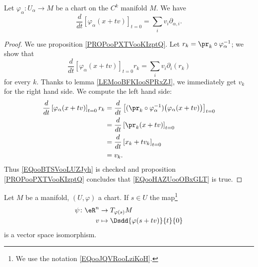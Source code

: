 \begin{proposition}	\label{PROPooOSCIooFPRtRg}
	Let \(\varphi_{\alpha} \colon U_{\alpha}\to M  \) be a chart on the \( C^k\) manifold \( M\). We have
	\begin{equation}		\label{EQooHAZUooOBxGLT}
		\frac{d}{dt} \left[\varphi_{\alpha}(x+tv)  \right]_{t=0}=\sum_iv_i\partial_{\alpha,i}.
	\end{equation}
\end{proposition}

\begin{proof}
	We use proposition \ref{PROPooPXTVooKIzptQ}. Let \( r_k=\pr_k\circ\varphi_{\alpha}^{-1}\); we show that
	\begin{equation}		\label{EQooBTSVooLUZJyh}
		\frac{d}{dt} \left[ \varphi_{\alpha}(x+tv)  \right]_{t=0}r_k=\sum_iv_i\partial_i(r_k)
	\end{equation}
	for every \( k\). Thanks to lemma \ref{LEMooBFKIooSPRxZJ}, we immediately get \( v_k\) for the right hand side. We compute the left hand side:
	\begin{subequations}
		\begin{align}
			\frac{d}{dt} \left[ \varphi_{\alpha}(x+tv)  \right]_{t=0}r_k & =\frac{d}{dt} \left[ (\pr_k\circ\varphi_{\alpha}^{-1})\big( \varphi_{\alpha}(x+tv) \big)  \right]_{t=0} \\
			                                                             & =\frac{d}{dt} \left[ \pr_k(x+tv)  \right]_{t=0}                                                         \\
			                                                             & =\frac{d}{dt} \left[ x_k+tv_k  \right]_{t=0}                                                            \\
			                                                             & =v_k.
		\end{align}
	\end{subequations}
	Thus \eqref{EQooBTSVooLUZJyh} is checked and proposition \ref{PROPooPXTVooKIzptQ} concludes that \eqref{EQooHAZUooOBxGLT} is true.
\end{proof}


\begin{proposition}     \label{PROPooMEPPooRonxuh}
	Let \( M\) be a manifold, \( (U, \varphi)\) a chart. If \( s\in U\) the map\footnote{We use the notation \eqref{EQooJQVRooLziKoH}.}
	\begin{equation}        \label{EQooJMTJooZNzREy}
		\begin{aligned}
			\psi\colon \eR^n & \to T_{\varphi(s)}M                  \\
			v                & \mapsto \Dsdd{ \varphi(s+tv) }{t}{0}
		\end{aligned}
	\end{equation}
	is a vector space isomorphism.
\end{proposition}

